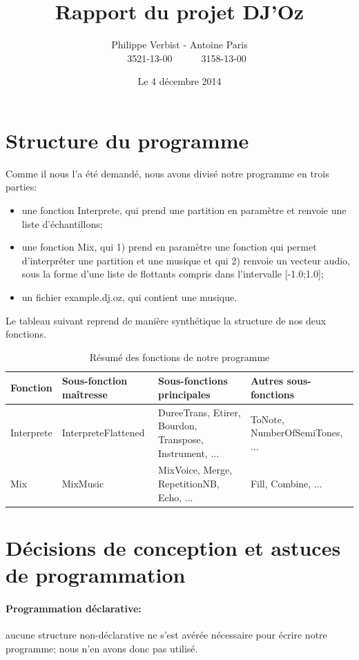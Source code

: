 \documentclass[10pt,a4paper]{article}
\author{Philippe Verbist - Antoine Paris \\ \ \ \ 3521-13-00\ \ \ \ \ \ 3158-13-00}
\title{\textbf{Rapport du projet DJ'Oz}}
\date{Le 4 décembre 2014}
\begin{document}
\sloppy
\maketitle


\section{Structure du programme}
Comme il nous l'a été demandé, nous avons divisé notre programme en trois parties:
\begin{itemize}
	\item une fonction Interprete, qui prend une partition en paramètre et  renvoie une liste d'échantillons;
	\item une fonction Mix, qui 1) prend en paramètre une fonction qui permet d'interpréter une partition  et une musique et qui  2) renvoie un vecteur audio, sous la forme d'une liste de flottants compris dans l'intervalle [-1.0;1.0];
	\item un fichier example.dj.oz, qui contient une musique.
\end{itemize}
\vspace{0.5 cm}

Le tableau suivant reprend de manière synthétique la structure de nos deux fonctions.


	\begin{table}[ht!]
		\centering
			\begin{tabular}{|p{}|p{}|p{0.25\textwidth}|p{}|}
			\hline
			\textbf{Fonction}		& \textbf{Sous-fonction maîtresse}& \textbf{Sous-fonctions principales} & \textbf{Autres sous-fonctions}	\\
			\hline
Interprete		&InterpreteFlattened	& DureeTrans, Etirer, Bourdon, Transpose, Instrument, ... & ToNote, NumberOfSemiTones, ...\\
			\hline
Mix 	& MixMusic &  MixVoice, Merge, RepetitionNB, Echo, ... &  Fill, Combine, ...\\
			\hline 


			\hline
			\end{tabular}
		\caption{Résumé des fonctions de notre programme}
	\end{table}


\section{Décisions de conception et astuces de programmation}
\paragraph{Programmation déclarative:} aucune structure non-déclarative ne s'est avérée nécessaire pour écrire notre programme; nous n'en avons donc pas utilisé.
\end{document}
